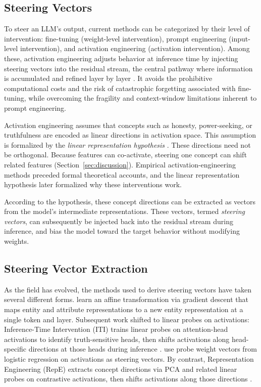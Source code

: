 \subsection{Steering Vectors}\label{sec:bg_steering_vectors}
To steer an LLM's output, current methods can be categorized by their level of intervention: fine-tuning (weight-level intervention), prompt engineering (input-level intervention), and activation engineering (activation intervention).
Among these, activation engineering adjusts behavior at inference time by injecting steering vectors into the residual stream, the central pathway where information is accumulated and refined layer by layer \citep{yuExploringResidualStream2023}.
It avoids the prohibitive computational costs and the risk of catastrophic forgetting associated with fine-tuning, while overcoming the fragility and context-window limitations inherent to prompt engineering.

Activation engineering assumes that concepts such as honesty, power-seeking, or truthfulness are encoded as linear directions in activation space.
This assumption is formalized by the \textit{linear representation hypothesis} \citep{parkLinearRepresentationHypothesis2024}.
These directions need not be orthogonal.
Because features can co-activate, steering one concept can shift related features (Section~\ref{sec:discussion}).
Empirical activation-engineering methods preceded formal theoretical accounts, and the linear representation hypothesis later formalized why these interventions work.

According to the hypothesis, these concept directions can be extracted as vectors from the model's intermediate representations.
These vectors, termed \textit{steering vectors}, can subsequently be injected back into the residual stream during inference, and bias the model toward the target behavior without modifying weights.

\subsection{Steering Vector Extraction}\label{sec:bg_extraction}
As the field has evolved, the methods used to derive steering vectors have taken several different forms.
\citet{hernandezInspectingEditingKnowledge2023} learn an affine transformation via gradient descent that maps entity and attribute representations to a new entity representation at a single token and layer.
Subsequent work shifted to linear probes on activations: Inference-Time Intervention (ITI) trains linear probes on attention-head activations to identify truth-sensitive heads, then shifts activations along head-specific directions at those heads during inference \citep{liInferenceTimeInterventionEliciting2024}.
\cite{vonrutteLanguageModelsGuide2024} use probe weight vectors from logistic regression on activations as steering vectors.
By contrast, Representation Engineering (RepE) extracts concept directions via PCA and related linear probes on contrastive activations, then shifts activations along those directions \citep{zouRepresentationEngineeringTopDown2025}.

